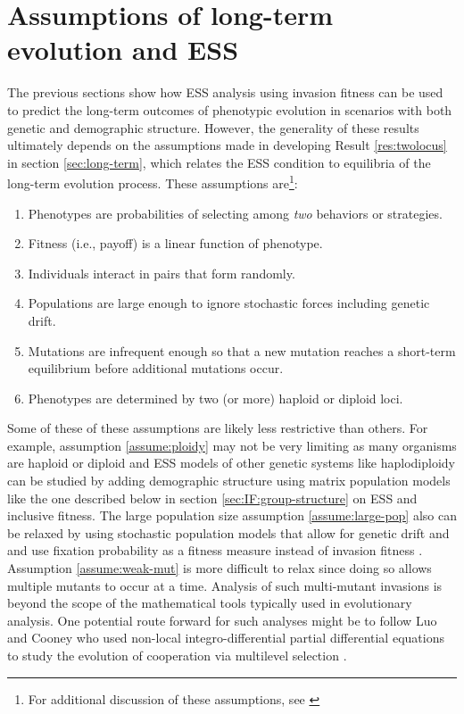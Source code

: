 \documentclass[11pt]{article}
\begin{document}
\section{Assumptions of long-term evolution and ESS}

The previous sections show how ESS analysis using invasion fitness can be used to predict the long-term outcomes of phenotypic evolution in scenarios with both genetic and demographic structure. However, the generality of these results ultimately depends on the assumptions made in developing Result \ref{res:twolocus} in section \ref{sec:long-term}, which relates the ESS condition to equilibria of the long-term evolution process. These assumptions are\footnote{For additional discussion of these assumptions, see \cite{Eshel:1996,Hammerstein:1996,Weissing:1996}}:
\begin{enumerate}[nosep]
  \item Phenotypes are probabilities of selecting among \textit{two} behaviors or strategies. \label{assume:twostrat}
  \item Fitness (i.e., payoff) is a linear function of phenotype. \label{assume:linear}
  \item Individuals interact in pairs that form randomly. \label{assume:pairwise}
  \item Populations are large enough to ignore stochastic forces including genetic drift. \label{assume:large-pop}
  \item Mutations are infrequent enough so that a new mutation reaches a short-term equilibrium before additional mutations occur. \label{assume:weak-mut}
  \item Phenotypes are determined by two (or more) haploid or diploid loci. \label{assume:ploidy}
\end{enumerate}
Some of these of these assumptions are likely less restrictive than others. For example, assumption \ref{assume:ploidy} may not be very limiting as many organisms are haploid or diploid and ESS models of other genetic systems like haplodiploidy can be studied by adding demographic structure using matrix population models \cite{Taylor:1990,Taylor:Frank:1996,Frank:1998} like the one described below in section \ref{sec:IF:group-structure} on ESS and inclusive fitness. The large population size assumption \ref{assume:large-pop} also can be relaxed by using stochastic population models that allow for genetic drift and and use fixation probability as a fitness measure instead of invasion fitness \cite{Rousset:Billiard:2000,Rousset:2003,Nowak:Sasaki:2004,Lessard:2005,VanCleve:2015}. Assumption \ref{assume:weak-mut} is more difficult to relax since doing so allows multiple mutants to occur at a time. Analysis of such multi-mutant invasions is beyond the scope of the mathematical tools typically used in evolutionary analysis. One potential route forward for such analyses might be to follow Luo and Cooney who used non-local integro-differential partial differential equations to study the evolution of cooperation via multilevel selection \cite{Luo:2014,Luo:Mattingly:2017,Cooney:2019,Cooney:2020,Cooney:Mori:2022}.
\end{document}
